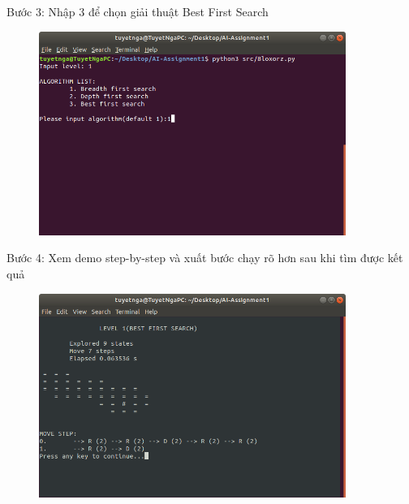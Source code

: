 \documentclass[11pt,a4paper]{article}
\begin{document}
\newpage
\begin{flushleft}
	\hspace{3 cm} Bước 3: Nhập 3 để chọn giải thuật Best First Search
\end{flushleft}
\begin{center}
	\begin{figure}[htp]
		\begin{center}
			\includegraphics[width=10cm]{Images/breadth1.png}
		\end{center}
		\caption{\label{fig:best1}}
	\end{figure}
\end{center}
\begin{flushleft}
	\hspace{2 cm}	Bước 4: Xem demo step-by-step và xuất bước chạy rõ hơn sau khi tìm được kết quả
\end{flushleft}
\begin{center}
	\begin{figure}[htp]
		\begin{center}
			\includegraphics[width=10cm]{Images/best3.png}
		\end{center}
		\caption{\label{fig:best3}}
	\end{figure}
\end{center}
\newpage
\end{document}
